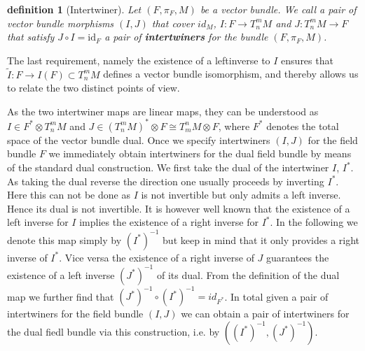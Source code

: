 \documentclass[a4paper,12pt, DIV=14, BCOR=5mm, twoside, headsepline]{scrbook}
\newtheorem{definition}{definition}[section]
\newtheorem*{remark}{Remark}
\begin{document}
\begin{definition}[Intertwiner]\label{interDef}
Let $(F,\pi_F,M)$ be a vector bundle. We call a pair of vector bundle morphisms $(I,J)$ that cover $id_M$,
$I: F \rightarrow T^m_n M$ and $J: T^m_n M \rightarrow F $ that satisfy  $J \circ I = \mathrm{id}_F$ a pair of \textbf{\textit{intertwiners}} for the bundle $(F, \pi_F, M)$.
\end{definition}
The last requirement, namely the existence of a leftinverse to $I$ ensures that $\tilde{I} : F \rightarrow I(F) \subset T^m_nM$ defines a vector bundle isomorphism, and thereby allows us to relate the two distinct points of view.

%
%
%
%
%
As the two intertwiner maps are linear maps, they can be understood as $I \in F^{\ast} \otimes T^m_n M$ and $J \in (T^m_nM)^{\ast} \otimes F \cong T^n_m M \otimes F$, where $F^{\ast}$ denotes the total space of the vector bundle dual. 
Once we specify intertwiners $(I,J)$ for the field bundle $F$ we immediately obtain intertwiners for the dual field bundle by means of the standard dual construction. We first take the dual of the intertwiner $I$, $I^{\ast}$. As taking the dual reverse the direction one usually proceeds by inverting $I^{\ast}$. Here this can not be done as $I$ is not invertible but only admits a left inverse. Hence its dual is not invertible. It is however well known that the existence of a left inverse for $I$ implies the existence of a right inverse for $I^{\ast}$. 
%
%
In the following we denote this map simply by $(I^{\ast})^{-1}$ but keep in mind that it only provides a right inverse of $I^{\ast}$. Vice versa the existence of a right inverse of $J$ guarantees the existence of a left inverse $(J^{\ast})^{-1}$ of its dual. From the definition of the dual map we further find that $(J^{\ast})^{-1} \circ (I^{\ast})^{-1} = id_{F^{\ast}}$. In total given a pair of intertwiners for the field bundle $(I,J)$ we can obtain a pair of intertwiners for the dual fiedl bundle via this construction, i.e. by $((I^{\ast})^{-1}, (J^{\ast})^{-1})$. \\
\end{document}
